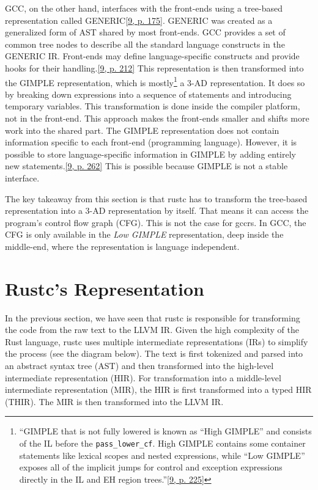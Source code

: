 \documentclass[
  11pt,
  twoside,symmetric]{report}
\begin{document}
GCC, on the other hand, interfaces with the front-ends using a
tree-based representation called
GENERIC\protect\hyperlink{ref-gccint}{{[}9, p. 175{]}}. GENERIC was
created as a generalized form of AST shared by most front-ends. GCC
provides a set of common tree nodes to describe all the standard
language constructs in the GENERIC IR. Front-ends may define
language-specific constructs and provide hooks for their
handling.\protect\hyperlink{ref-gccint}{{[}9, p. 212{]}} This
representation is then transformed into the GIMPLE representation, which
is mostly\footnote{``GIMPLE that is not fully lowered is known as ``High
  GIMPLE'' and consists of the IL before the \texttt{pass\_lower\_cf}.
  High GIMPLE contains some container statements like lexical scopes and
  nested expressions, while ``Low GIMPLE'' exposes all of the implicit
  jumps for control and exception expressions directly in the IL and EH
  region trees.''\protect\hyperlink{ref-gccint}{{[}9, p. 225{]}}} a 3-AD
representation. It does so by breaking down expressions into a sequence
of statements and introducing temporary variables. This transformation
is done inside the compiler platform, not in the front-end. This
approach makes the front-ends smaller and shifts more work into the
shared part. The GIMPLE representation does not contain information
specific to each front-end (programming language). However, it is
possible to store language-specific information in GIMPLE by adding
entirely new statements.\protect\hyperlink{ref-gccint}{{[}9, p. 262{]}}
This is possible because GIMPLE is not a stable interface.

The key takeaway from this section is that rustc has to transform the
tree-based representation into a 3-AD representation by itself. That
means it can access the program's control flow graph (CFG). This is not
the case for gccrs. In GCC, the CFG is only available in the \emph{Low
GIMPLE} representation, deep inside the middle-end, where the
representation is language independent.

\hypertarget{rustcs-representation}{%
\section{Rustc's Representation}\label{rustcs-representation}}

In the previous section, we have seen that rustc is responsible for
transforming the code from the raw text to the LLVM IR. Given the high
complexity of the Rust language, rustc uses multiple intermediate
representations (IRs) to simplify the process (see the diagram below).
The text is first tokenized and parsed into an abstract syntax tree
(AST) and then transformed into the high-level intermediate
representation (HIR). For transformation into a middle-level
intermediate representation (MIR), the HIR is first transformed into a
typed HIR (THIR). The MIR is then transformed into the LLVM IR.
\end{document}
